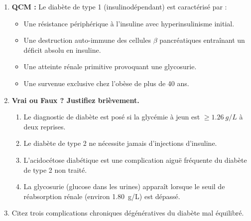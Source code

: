 \documentclass[11pt]{article}
\begin{document}
\begin{exercice}
\begin{enumerate}
\item \textbf{QCM :} Le diabète de type 1 (insulinodépendant) est caractérisé par :
\begin{itemize}
\item[A.] Une résistance périphérique à l'insuline avec hyperinsulinisme initial.
\item[B.] Une destruction auto-immune des cellules $\beta$ pancréatiques entraînant un déficit absolu en insuline.
\item[C.] Une atteinte rénale primitive provoquant une glycosurie.
\item[D.] Une survenue exclusive chez l'obèse de plus de 40 ans.
\end{itemize}
\item \textbf{Vrai ou Faux ? Justifiez brièvement.}
\begin{enumerate}
\item Le diagnostic de diabète est posé si la glycémie à jeun est $\ge \SI{1,26}{g/L}$ à deux reprises.
\item Le diabète de type 2 ne nécessite jamais d'injections d'insuline.
\item L'acidocétose diabétique est une complication aiguë fréquente du diabète de type 2 non traité.
\item La glycosurie (glucose dans les urines) apparaît lorsque le seuil de réabsorption rénale (environ \SI{1,80}{g/L}) est dépassé.
\end{enumerate}
\item Citez trois complications chroniques dégénératives du diabète mal équilibré.
\end{enumerate}
\end{exercice}
\end{document}
